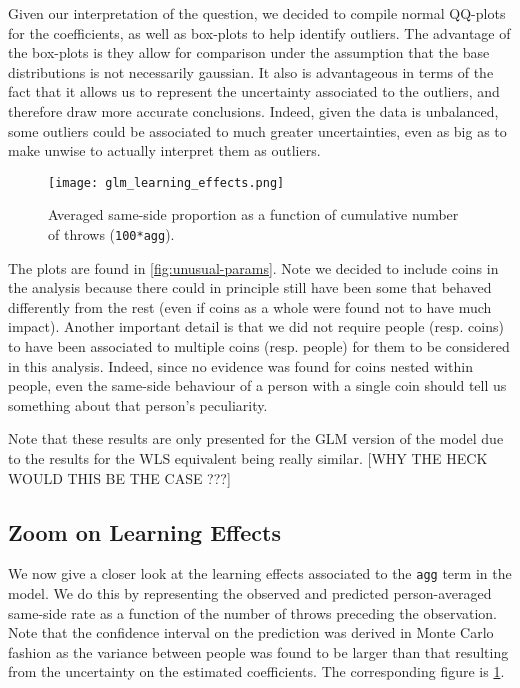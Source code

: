 \documentclass[a4paper, 12pt,oneside]{article}
\begin{document}
		Given our interpretation of the question, we decided to compile normal QQ-plots for the coefficients, as well as box-plots to help identify outliers. The advantage of the box-plots is they allow for comparison under the assumption that the base distributions is not necessarily gaussian. 
		It also is advantageous in terms of the fact that it allows us to represent the uncertainty associated to the outliers, and therefore draw more accurate conclusions. Indeed, given the data is unbalanced, some outliers could be associated to much greater uncertainties, even as big as to make unwise to actually interpret them as outliers. 
		
		\begin{figure}[htb]
			\centering
			\texttt{[image: glm\_learning\_effects.png]}
			\caption{Averaged same-side proportion as a function of cumulative number of throws (\texttt{100*agg}).}
			\label{fig:learning-effects}
		\end{figure}
		The plots are found in \ref{fig:unusual-params}. Note we decided to include coins in the analysis because there could in principle still have been some that behaved differently from the rest (even if coins as a whole were found not to have much impact). 
		Another important detail is that we did not require people (resp. coins) to have been associated to multiple coins (resp. people) for them to be considered in this analysis. Indeed, since no evidence was found for coins nested within people, even the same-side behaviour of a person with a single coin should tell us something about that person's peculiarity.

		Note that these results are only presented for the GLM version of the model due to the results for the WLS equivalent being really similar. [WHY THE HECK WOULD THIS BE THE CASE ???]
		\subsection{Zoom on Learning Effects}
			We now give a closer look at the learning effects associated to the \texttt{agg} term in the model. We do this by representing the observed and predicted person-averaged same-side rate as a function of the number of throws preceding the observation.  Note that the confidence interval on the prediction was derived in Monte Carlo fashion as the variance between people was found to be larger than that resulting from the uncertainty on the estimated coefficients. 
			The corresponding figure is \ref{fig:learning-effects}.
			
\end{document}

